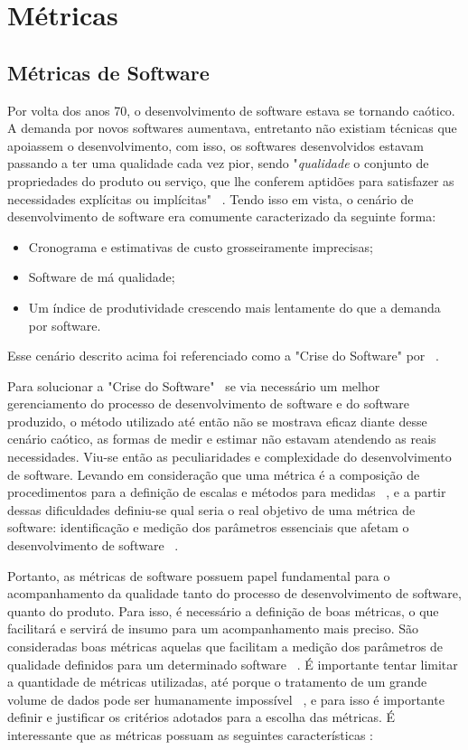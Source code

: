 \chapter{Métricas} \label{chap:metricas}

\section{Métricas de Software}

Por volta dos anos 70, o desenvolvimento de software estava se tornando caótico. A demanda por novos softwares aumentava,
entretanto não existiam técnicas que apoiassem o desenvolvimento, com isso, os softwares desenvolvidos estavam passando
a ter uma qualidade cada vez pior, sendo "\emph{qualidade} o conjunto de propriedades do produto ou serviço, que lhe conferem 
aptidões para satisfazer as necessidades explícitas ou implícitas" ~\cite{iso:8402}. Tendo isso em vista, o cenário de
desenvolvimento de software era comumente caracterizado da seguinte forma:

\begin{itemize}
  \item Cronograma e estimativas de custo grosseiramente imprecisas;
  \item Software de má qualidade;
  \item Um índice de produtividade crescendo mais lentamente do que a demanda por software.
\end{itemize}

Esse cenário descrito acima foi referenciado como a "Crise do Software" por
~.

Para solucionar a "Crise do Software" ~se via necessário um melhor gerenciamento do processo de desenvolvimento de software
e do software produzido, o método utilizado até então não se mostrava eficaz diante desse cenário caótico, as formas de medir 
e estimar não estavam atendendo as reais necessidades. Viu-se então as peculiaridades e complexidade do desenvolvimento de 
software. Levando em consideração que uma métrica é a composição de procedimentos para a definição de escalas e métodos para 
medidas ~\cite{iso:9126-1}, e a partir dessas dificuldades definiu-se qual seria o real objetivo de uma métrica de software: 
identificação e medição dos parâmetros essenciais que afetam o desenvolvimento de software ~\cite{mills88}.

Portanto, as métricas de software possuem papel fundamental para o acompanhamento da qualidade tanto do processo de
desenvolvimento de software, quanto do produto. Para isso, é necessário a definição de boas métricas, o que facilitará
e servirá de insumo para um acompanhamento mais preciso. São consideradas boas métricas aquelas que facilitam a medição dos 
parâmetros de qualidade definidos para um determinado software ~\cite{mills88}. É importante tentar limitar a quantidade
de métricas utilizadas, até porque o tratamento de um grande volume de dados pode ser humanamente impossível 
~\cite{meirelles2013}, e para isso é importante definir e justificar os critérios adotados para a escolha das métricas.
É interessante que as métricas possuam as seguintes características \cite{fenton&pfleenger98,mills88}:

